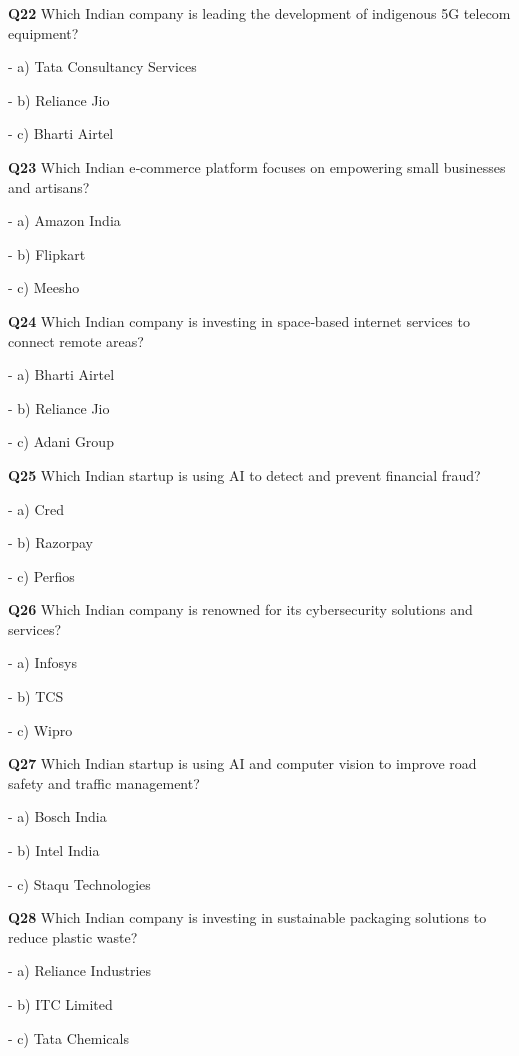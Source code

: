 \textbf{Q22} Which Indian company is leading the development of indigenous 5G telecom equipment?\par
\quad - a) Tata Consultancy Services\par
\quad - b) Reliance Jio\par
\quad - c) Bharti Airtel\par

\textbf{Q23} Which Indian e‑commerce platform focuses on empowering small businesses and artisans?\par
\quad - a) Amazon India\par
\quad - b) Flipkart\par
\quad - c) Meesho\par

\textbf{Q24} Which Indian company is investing in space‑based internet services to connect remote areas?\par
\quad - a) Bharti Airtel\par
\quad - b) Reliance Jio\par
\quad - c) Adani Group\par

\textbf{Q25} Which Indian startup is using AI to detect and prevent financial fraud?\par
\quad - a) Cred\par
\quad - b) Razorpay\par
\quad - c) Perfios\par

\textbf{Q26} Which Indian company is renowned for its cybersecurity solutions and services?\par
\quad - a) Infosys\par
\quad - b) TCS\par
\quad - c) Wipro\par

\textbf{Q27} Which Indian startup is using AI and computer vision to improve road safety and traffic management?\par
\quad - a) Bosch India\par
\quad - b) Intel India\par
\quad - c) Staqu Technologies\par

\textbf{Q28} Which Indian company is investing in sustainable packaging solutions to reduce plastic waste?\par
\quad - a) Reliance Industries\par
\quad - b) ITC Limited\par
\quad - c) Tata Chemicals\par

